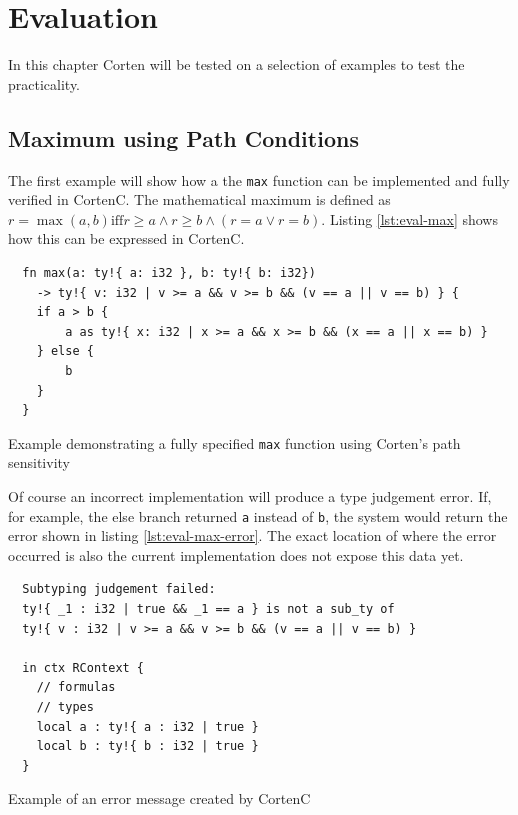 \documentclass{book}
\newcommand{\code}[1]{\texttt{#1}}
\theoremstyle{definition}
\begin{document}

\chapter{Evaluation}

In this chapter Corten will be tested on a selection of examples to test the practicality.

\section{Maximum using Path Conditions}

The first example will show how a the \code{max} function can be implemented and fully verified in CortenC. The mathematical maximum is defined as $r = \max(a, b) \text{iff} r \geq a \wedge r \geq b \wedge (r = a \vee r = b)$. Listing \ref{lst:eval-max} shows how this can be expressed in CortenC.


\begin{listing}[ht]
  \begin{verbatim}
  fn max(a: ty!{ a: i32 }, b: ty!{ b: i32}) 
    -> ty!{ v: i32 | v >= a && v >= b && (v == a || v == b) } {
    if a > b {
        a as ty!{ x: i32 | x >= a && x >= b && (x == a || x == b) }
    } else {
        b
    }
  }
  \end{verbatim}
  \caption{Example demonstrating a fully specified \code{max} function using Corten's path sensitivity}
  \label{lst:eval-max}
\end{listing}

Of course an incorrect implementation will produce a type judgement error. If, for example, the else branch returned \code{a} instead of \code{b}, the system would return the error shown in listing \ref{lst:eval-max-error}. The exact location of where the error occurred is also the current implementation does not expose this data yet.

\begin{listing}[ht]
  \begin{verbatim}
  Subtyping judgement failed: 
  ty!{ _1 : i32 | true && _1 == a } is not a sub_ty of 
  ty!{ v : i32 | v >= a && v >= b && (v == a || v == b) } 

  in ctx RContext {
    // formulas
    // types
    local a : ty!{ a : i32 | true }
    local b : ty!{ b : i32 | true }
  }
  \end{verbatim}
  \caption{Example of an error message created by CortenC}
  \label{lst:eval-max-error}
\end{listing}
\end{document}
